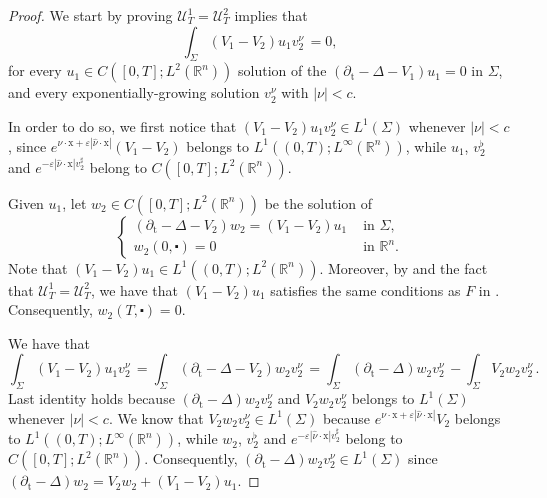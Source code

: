 \documentclass[10pt,a4paper]{amsart}
\theoremstyle{remark}
\theoremstyle{definition}
\newcommand{\R}{\mathbb{R}}
\newcommand{\tm}{\mathrm{t}}
\newcommand{\x}{\mathrm{x}}
\begin{document}
\begin{proof}
We start by proving $\mathcal{U}_{T}^{1}=\mathcal{U}_{T}^{2}$ implies that
\begin{equation}\label{EXP-PHYSICAL}
\int_{\Sigma}\left(V_{1}-V_{2}\right) u_{1} v_{2}^{\nu} \, =0,
\end{equation}
for every $u_{1}\in C([0,T]; L^2(\R^n))$ solution of the $(\partial_\tm - \Delta - V_{1})u_1 = 0$ in $\Sigma$, and every exponentially-growing solution $v_{2}^{\nu}$ with $|\nu| < c$.

In order to do so, we first notice that $(V_1 - V_2) u_1 v_2^\nu \in L^1(\Sigma)$
whenever $|\nu| < c$, since $ e^{\nu \cdot \x + \varepsilon |\hat \nu \cdot \x|} (V_1 - V_2)$
belongs to $L^1((0,T); L^\infty(\R^n))$, while $u_1$, $v_2^\flat$ and $e^{-\varepsilon |\hat \nu \cdot \x| v_2^\sharp}$ belong to $C([0, T] ; L^{2}(\mathbb{R}^{n}))$.


Given $u_{1}$, let $w_{2} \in C([0, T] ; L^{2}(\mathbb{R}^{n}))$ be the solution of 
$$
\begin{cases}\left( \partial_{\tm}-\Delta-V_{2}\right) w_{2}=\left(V_{1}-V_{2}\right) u_{1} & \text { in } \Sigma, \\ w_{2}(0, \centerdot)=0 & \text { in } \mathbb{R}^{n}.\end{cases}
$$
Note that $(V_{1}-V_{2})u_{1} \in L^{1}((0, T) ; L^{2}(\mathbb{R}^{n}))$. Moreover, by 
 and the fact that $\mathcal{U}_{T}^{1}=\mathcal{U}_{T}^{2}$,
we have that $(V_{1}-V_{2})u_{1}$ satisfies the same conditions as $F$ in 
. Consequently, $w_2(T, \centerdot)= 0$.

We have that
\[\int_{\Sigma}\left(V_{1}-V_{2}\right) u_{1} v_{2}^{\nu} \, = \int_{\Sigma}\left( \partial_{\tm}-\Delta-V_{2}\right) w_{2} v_{2}^{\nu} \, = \int_{\Sigma}\left( \partial_{\tm}-\Delta\right) w_{2} v_{2}^{\nu} \, - \int_{\Sigma} V_{2} w_{2} v_{2}^{\nu} \, .
\]
Last identity holds because $\left( \partial_{\tm}-\Delta\right) w_{2} v_{2}^{\nu}$ and 
$V_{2} w_{2} v_{2}^{\nu}$ belongs to $L^1(\Sigma)$ whenever $|\nu| < c$. We know that 
$V_{2} w_{2} v_{2}^{\nu} \in L^1(\Sigma)$ because 
$ e^{\nu \cdot \x + \varepsilon |\hat \nu \cdot \x|} V_2$ belongs to $L^1((0,T); L^\infty(\R^n))$, while $w_2$, $v_2^\flat$ and 
$e^{-\varepsilon |\hat \nu \cdot \x| v_2^\sharp}$ belong to
$C([0, T] ; L^{2}(\mathbb{R}^{n}))$. Consequently, 
$\left( \partial_{\tm}-\Delta\right) w_{2} v_{2}^{\nu} \in L^1(\Sigma)$ since
$(\partial_{\tm}-\Delta)w_2 = V_{2} w_{2} + \left(V_{1}-V_{2}\right) u_{1}$.




\end{proof}
\end{document}
